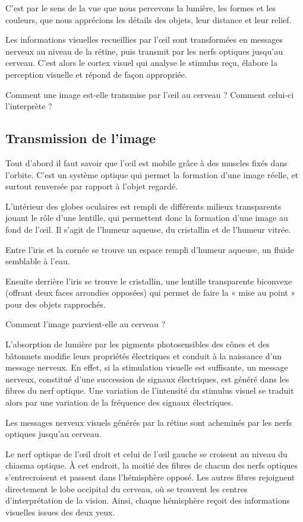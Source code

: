 \documentclass[a4paper, 12pt, onecolumn, openany]{report}
\begin{document}
	C'est par le sens de la vue que nous percevons la lumière, les formes et les couleurs, que nous apprécions les détails des objets, leur distance et leur relief.
	
	Les informations visuelles recueillies par l'œil sont transformées en messages nerveux au niveau de la rétine, puis transmit par les nerfs optiques jusqu'au cerveau. C'est alors le cortex visuel qui analyse le stimulus reçu, élabore la perception visuelle et répond de façon appropriée.
	
	Comment une image est-elle transmise par l’œil au cerveau ? Comment celui-ci l’interprète ?

		\subsection{Transmission de l'image}
		Tout d'abord il faut savoir que  l'œil est mobile grâce à des muscles fixés dans l'orbite. C'est un système optique qui permet la formation d'une image réelle, et surtout  renversée par rapport à l'objet regardé.  
	
	L'intérieur des globes oculaires est rempli de différents milieux transparents jouant le rôle d'une lentille, qui permettent donc la formation d'une image au fond de l'œil. Il s'agit de l'humeur aqueuse, du cristallin et de l'humeur vitrée.
	
	Entre l'iris et la cornée se trouve un espace rempli d'humeur aqueuse, un fluide semblable à l'eau.
	
	Ensuite derrière l'iris se trouve le cristallin, une lentille transparente biconvexe (offrant deux faces arrondies opposées) qui permet de faire la « mise au point » pour des objets rapprochés.
	
	Comment l'image parvient-elle au cerveau ?
	
	L'absorption de lumière par les pigments photosensibles des cônes et des bâtonnets modifie leurs propriétés électriques et conduit à la naissance d'un message nerveux. En effet, si la stimulation visuelle est suffisante, un message nerveux, constitué d'une succession de signaux électriques, est généré dans les fibres du nerf optique. Une variation de l'intensité du stimulus visuel se traduit alors par une variation de la fréquence des signaux électriques.
	
	Les messages nerveux visuels générés par la rétine sont acheminés par les nerfs optiques jusqu'au cerveau.
	
	Le nerf optique de l'œil droit et celui de l'œil gauche se croisent au niveau du chiasma optique. À cet endroit, la moitié des fibres de chacun des nerfs optiques s'entrecroisent et passent dans l'hémisphère opposé. Les autres fibres rejoignent directement le lobe occipital du cerveau, où se trouvent les centres d'interprétation de la vision. Ainsi, chaque hémisphère reçoit des informations visuelles issues des deux yeux.
		
\end{document}
